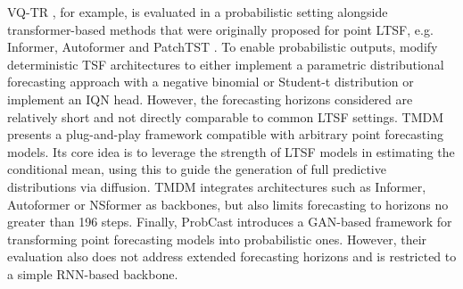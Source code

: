 \documentclass[a4paper,oneside,bibliography=totoc]{scrbook}
\begin{document}
VQ-TR \cite{rasul_vq-tr_2023}, for example, is evaluated in a probabilistic setting alongside transformer-based methods that were originally proposed for point LTSF, e.g. Informer, Autoformer and PatchTST \cite{zhou_informer_2021, wu_autoformer_2021, nie_time_2022}. 
To enable probabilistic outputs, \citet{rasul_vq-tr_2023} modify deterministic TSF architectures to either implement a parametric distributional forecasting approach with a negative binomial or Student-t distribution or implement an IQN head. 
However, the forecasting horizons considered are relatively short and not directly comparable to common LTSF settings. 
TMDM \cite{li_transformer-modulated_2023} presents a plug-and-play framework compatible with arbitrary point forecasting models. Its core idea is to leverage the strength of LTSF models in estimating the conditional mean, using this to guide the generation of full predictive distributions via diffusion.
TMDM integrates architectures such as Informer, Autoformer or NSformer \cite{zhou_informer_2021, wu_autoformer_2021, liu_non-stationary_2022} as backbones, but also limits forecasting to horizons no greater than 196 steps. 
Finally, ProbCast \cite{koochali_if_2021} introduces a GAN-based framework for transforming point forecasting models into probabilistic ones. However, their evaluation also does not address extended forecasting horizons and is restricted to a simple RNN-based backbone.
\newline
\end{document}
